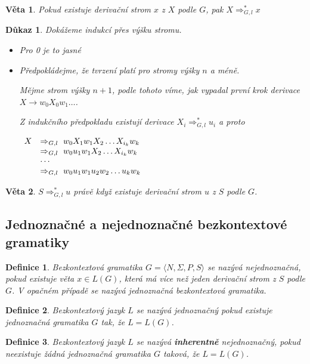 \documentclass[10pt, a4paper, titlepage]{article}
\theoremstyle{note}
\newtheorem{dukaz}{Důkaz}
\newtheorem{veta}{Věta}
\newtheorem{definice}{Definice}
\begin{document}
\begin{veta}
Pokud existuje derivační strom $x$ z $X$ podle $G$, pak $X \Rightarrow_{G,l}^* x$
\end{veta}
\begin{dukaz}
Dokážeme indukcí přes výšku stromu.
\begin{itemize}
\item
Pro 0 je to jasné
\item
Předpokládejme, že tvrzení platí pro stromy výšky $n$ a méně.

Mějme strom výšky $n+1$, podle tohoto víme, jak vypadal první krok derivace $X \rightarrow w_0X_0w_1 \ldots$.

Z indukčního předpokladu existují derivace $X_i \Rightarrow_{G,l}^* u_i$ a proto

$
\begin{array}{l l}
X & \Rightarrow_{G,l}\  w_0X_1w_1X_2 \ldots X_{i_k}w_k \\
& \Rightarrow_{G,l}\  w_0u_1w_1X_2 \ldots X_{i_k}w_k \\
& \cdots \\
& \Rightarrow_{G,l}\  w_0u_1w_1u_2w_2 \ldots u_kw_k
\end{array}
$
\end{itemize}
\end{dukaz}

\begin{veta}
$S\Rightarrow_{G,l}^* u$ právě když existuje derivační strom $u$ z $S$ podle $G$.
\end{veta}

\subsection{Jednoznačné a nejednoznačné bezkontextové gramatiky}

\begin{definice}
Bezkontextová gramatika $G = \langle N,\Sigma,P,S \rangle$ se nazývá nejednoznačná, pokud existuje věta $x \in L(G)$, která má více než jeden derivační strom z $S$ podle $G$. V opačném případě se nazývá jednoznačná bezkontextová gramatika.
\end{definice}

\begin{definice}
Bezkontextový jazyk $L$ se nazývá jednoznačný pokud existuje jednoznačná gramatika $G$ tak, že $L=L(G)$.
\end{definice}

\begin{definice}
Bezkontextový jazyk $L$ se nazývá \textbf{inherentně} nejednoznačný, pokud neexistuje žádná jednoznačná gramatika $G$ taková, že $L=L(G)$.
\end{definice}
\end{document}
